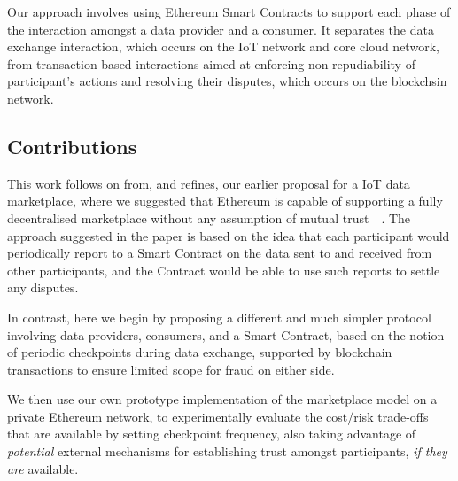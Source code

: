 \documentclass[letterpaper, 10 pt, conference]{ieeeconf}  %
\begin{document}
Our approach involves using Ethereum Smart Contracts to support each phase of the interaction amongst a data provider and a consumer. It separates the data exchange interaction, which occurs on the IoT network  and core cloud network, from transaction-based interactions aimed at enforcing non-repudiability of participant's actions and resolving their disputes, which occurs on the blockchsin network.

\subsection{Contributions} \label{sec:contributions}

This work follows on from, and refines, our earlier proposal for a IoT data marketplace, where we suggested that Ethereum is capable of supporting a fully decentralised marketplace without any assumption of mutual trust~~\cite{Missier2017}.
The approach suggested in the paper is based on the idea that each participant would periodically report to a Smart Contract on the data sent to and received from other participants, and the Contract would be able to use such reports to settle any disputes.

In contrast, here we begin by proposing a different and much simpler protocol involving data providers, consumers, and a Smart Contract, based on the notion of periodic checkpoints during data exchange, supported by blockchain transactions to ensure limited scope for fraud on either side. 

We then use our own prototype implementation of the  marketplace model on a private Ethereum network, to experimentally evaluate the cost/risk trade-offs that are available by setting checkpoint frequency, also taking advantage of \textit{potential} external mechanisms for establishing trust amongst participants, \textit{if they are} available.


\end{document}
